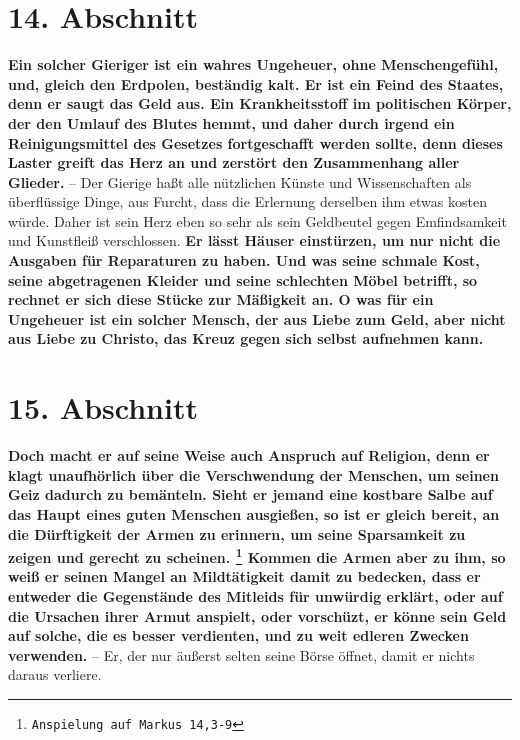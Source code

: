 \section{14. Abschnitt} \label{kap13_ab14}

\label{ref:13_14_reichtum_schaden}
\textbf{Ein solcher Gieriger ist ein wahres Ungeheuer,
ohne Menschengefühl, und, gleich
den Erdpolen, beständig kalt. Er ist ein Feind des Staates, denn er saugt das
Geld aus. Ein Krankheitsstoff im politischen Körper, der den Umlauf des Blutes
hemmt, und daher durch irgend ein Reinigungsmittel des
Gesetzes fortgeschafft
werden sollte, denn dieses Laster greift das Herz an und zerstört den
Zusammenhang aller Glieder.} -- Der Gierige haßt alle nützlichen
Künste und
Wissenschaften als überflüssige Dinge, aus
Furcht, dass die Erlernung derselben
ihm etwas kosten würde. Daher ist sein Herz eben so
sehr als sein Geldbeutel
gegen Emfindsamkeit und Kunstfleiß verschlossen. \label{ref:13_14_reichtum_einsturz}
\textbf{Er lässt Häuser einstürzen, um
nur nicht die Ausgaben für Reparaturen zu haben. Und was seine schmale Kost,
seine abgetragenen Kleider und seine schlechten Möbel betrifft, so rechnet er
sich diese Stücke zur Mäßigkeit an. O was für ein Ungeheuer ist ein solcher
Mensch, der aus Liebe zum Geld, aber nicht aus Liebe zu Christo, das
Kreuz
gegen sich selbst aufnehmen kann.}

\section{15. Abschnitt} \label{kap13_ab15}

\label{ref:13_15_Kapitalisten_kritik}
\textbf{Doch macht er auf seine Weise auch Anspruch auf Religion, denn er klagt
unaufhörlich über die Verschwendung der Menschen, um seinen
Geiz dadurch zu
bemänteln. Sieht er jemand eine kostbare Salbe auf das Haupt eines guten
Menschen ausgießen, so ist er gleich bereit, an die Dürftigkeit der Armen zu
erinnern, um seine Sparsamkeit zu zeigen und gerecht zu scheinen.
\footnote{\texttt{Anspielung auf Markus 14,3-9}}
Kommen die
Armen aber zu ihm, so weiß er seinen Mangel an
Mildtätigkeit damit zu bedecken,
dass er entweder die Gegenstände des Mitleids für unwürdig erklärt, oder auf die
Ursachen ihrer Armut anspielt, oder vorschüzt, er könne
sein Geld auf solche,
die es besser verdienten, und zu weit edleren Zwecken verwenden.} -- Er, der nur
äußerst selten seine Börse öffnet, damit er nichts daraus verliere.

